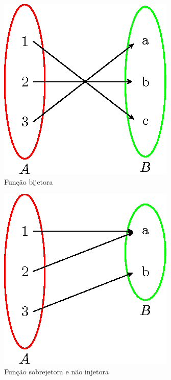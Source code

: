 \begin{multicols}{2}
\begin{figure}[H]
\centering
 \includegraphics{cap_funcao/figs/tikz/figura_cap_funcao_9}
\caption{Função bijetora}
\end{figure}

\begin{figure}[H]
\centering
 \includegraphics{cap_funcao/figs/tikz/figura_cap_funcao_10}
\caption{Função sobrejetora e não injetora}
\end{figure}
\end{multicols}


